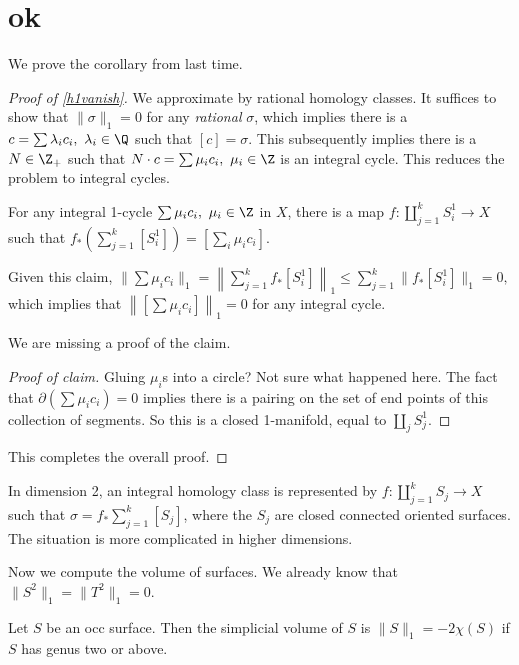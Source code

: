 \section{ok} 
We prove the corollary from last time.
\begin{proof}[Proof of \cref{h1vanish}]
    We approximate by rational homology classes. It suffices to show that $\|\sigma\|_1=0$ for any \emph{rational} $\sigma$, which implies there is a $c=\sum \lambda_i c_i ,\ \lambda_i  \in \Q$ such that $[c]=\sigma$. This subsequently implies there is a $N \in \Z_+$ such that $N\cdot c=\sum \mu_i  c_i ,\ \mu _i  \in \Z$ is an integral cycle. This reduces the problem to integral cycles.
    \begin{claim}
        For any integral 1-cycle $\sum \mu _i  c _i ,\ \mu _i  \in \Z$ in $X$, there is a map $f \colon \amalg _{j=1}^k S^1 _i  \to X$ such that $f_*\left( \sum_{j=1}^{k} [S^1 _i ] \right) =\left[ \sum _i  \mu_i c_i  \right] $.
    \end{claim}
    Given this claim, $\| \sum \mu _i  c_i \|_1=\left\| \sum_{j=1}^{k} f_*[S^1 _i ]\right\|_1 \leq \sum_{j=1}^{k} \|f_* [S^1 _i ]\|_1=0,$ which implies that $\left\|\left[ \sum \mu _i  c _i  \right] \right\|_1=0$ for any integral cycle.
    
    We are missing a proof of the claim.
    \begin{proof}[Proof of claim]
        Gluing $\mu_i $s into a circle? Not sure what happened here. The fact that $\partial \left( \sum \mu _i  c_i  \right) =0$ implies there is a pairing on the set of end points of this collection of segments. So this is a closed 1-manifold, equal to $\amalg _j  S^1 _j $.
    \end{proof}
    This completes the overall proof.
\end{proof}
\begin{remark}
    In dimension 2, an integral homology class is represented by $f \colon \amalg _{j=1}^kS _j  \to X$ such that $\sigma= f_* \sum _{j=1}^k [S_j ]$, where the $S_j $ are closed connected oriented surfaces. The situation is more complicated in higher dimensions.
\end{remark}
Now we compute the volume of surfaces. We already know that $\| S^2\|_1= \| T^2\|_1=0$.
\begin{theorem}
    Let $S$ be an occ surface. Then the simplicial volume of $S$ is $\|S\|_1= -2 \chi(S)$ if $S$ has genus two or above.
\end{theorem}
